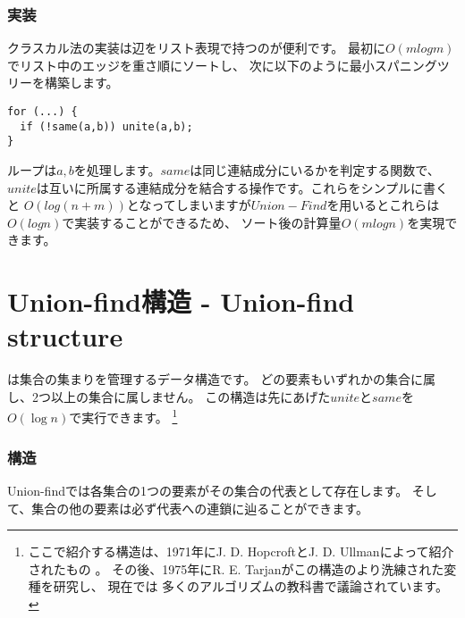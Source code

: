 \subsubsection{実装}

クラスカル法の実装は辺をリスト表現で持つのが便利です。
最初に$O(m log m)$でリスト中のエッジを重さ順にソートし、
次に以下のように最小スパニングツリーを構築します。

\begin{lstlisting}
for (...) {
  if (!same(a,b)) unite(a,b);
}
\end{lstlisting}

ループは$a,b$を処理します。$same$は同じ連結成分にいるかを判定する関数で、
$unite$は互いに所属する連結成分を結合する操作です。これらをシンプルに書くと
$O(log(n+m))$となってしまいますが$Union-Find$を用いるとこれらは$O(log n)$で実装することができるため、
ソート後の計算量$O(m log n)$を実現できます。

\section{Union-find構造 - Union-find structure}


 は集合の集まりを管理するデータ構造です。
どの要素もいずれかの集合に属し、2つ以上の集合に属しません。
この構造は先にあげた$unite$と$same$を$O(\log n)$で実行できます。
\footnote{ ここで紹介する構造は、1971年にJ. D. HopcroftとJ. D. Ullmanによって紹介されたもの \cite{hop71}。
その後、1975年にR. E. Tarjanがこの構造のより洗練された変種を研究し\cite{tar75}、
現在では 多くのアルゴリズムの教科書で議論されています。}

\subsubsection{構造}

Union-findでは各集合の1つの要素がその集合の代表として存在します。
そして、集合の他の要素は必ず代表への連鎖に辿ることができます。

